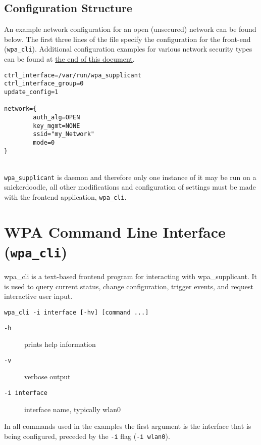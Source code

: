 \subsection{Configuration Structure}


\noindent
An example network configuration for an open (unsecured) network can be found below. The first three lines of the file specify the configuration for the front-end (\texttt{wpa\_cli}). Additional configuration examples for various network security types can be found at \hyperref[sec:wpaconftypes]{the end of this document}.

\begin{lstlisting}[style=text]
ctrl_interface=/var/run/wpa_supplicant
ctrl_interface_group=0
update_config=1

network={
        auth_alg=OPEN
        key_mgmt=NONE
        ssid="my_Network"
        mode=0
}
\end{lstlisting}

~\\
\noindent
\texttt{wpa\_supplicant} is daemon and therefore only one instance of it may be run on a snickerdoodle, all other modifications and configuration of settings must be made with the frontend application, \texttt{wpa\_cli}.

\section{WPA Command Line Interface (\texttt{wpa\_cli})}

wpa\_cli is a text-based frontend program for interacting with wpa\_supplicant. It is used to query current status,
change configuration, trigger events, and request interactive user input. \\

\begin{lstlisting}[style=text]
wpa_cli -i interface [-hv] [command ...]
\end{lstlisting}

\begin{description}
	\item[\texttt{-h}] prints help information
	\item[\texttt{-v}] verbose output
	\item[\texttt{-i interface}] interface name, typically wlan0
\end{description}


\noindent
In all commands used in the examples the first argument is the interface that is being configured, preceded by the \texttt{-i} flag (\texttt{-i wlan0}).


